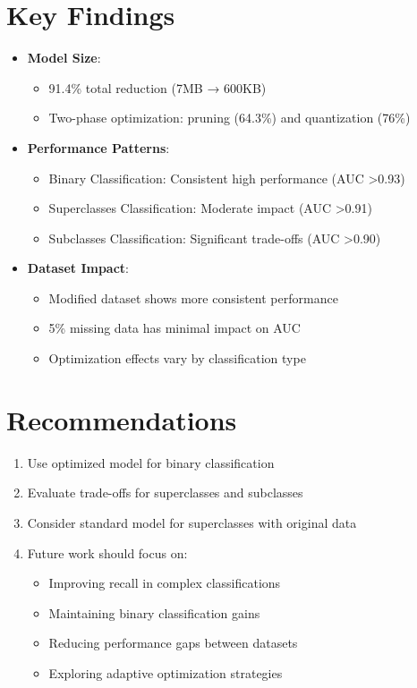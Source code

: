 \documentclass[12pt,a4paper]{article}
\begin{document}
\section{Key Findings}
\begin{itemize}
    \item \textbf{Model Size}:
    \begin{itemize}
        \item 91.4\% total reduction (7MB → 600KB)
        \item Two-phase optimization: pruning (64.3\%) and quantization (76\%)
    \end{itemize}
    
    \item \textbf{Performance Patterns}:
    \begin{itemize}
        \item Binary Classification: Consistent high performance (AUC >0.93)
        \item Superclasses Classification: Moderate impact (AUC >0.91)
        \item Subclasses Classification: Significant trade-offs (AUC >0.90)
    \end{itemize}
    
    \item \textbf{Dataset Impact}:
    \begin{itemize}
        \item Modified dataset shows more consistent performance
        \item 5\% missing data has minimal impact on AUC
        \item Optimization effects vary by classification type
    \end{itemize}
\end{itemize}

\section{Recommendations}
\begin{enumerate}
    \item Use optimized model for binary classification
    \item Evaluate trade-offs for superclasses and subclasses
    \item Consider standard model for superclasses with original data
    \item Future work should focus on:
    \begin{itemize}
        \item Improving recall in complex classifications
        \item Maintaining binary classification gains
        \item Reducing performance gaps between datasets
        \item Exploring adaptive optimization strategies
    \end{itemize}
\end{enumerate}
\end{document}
